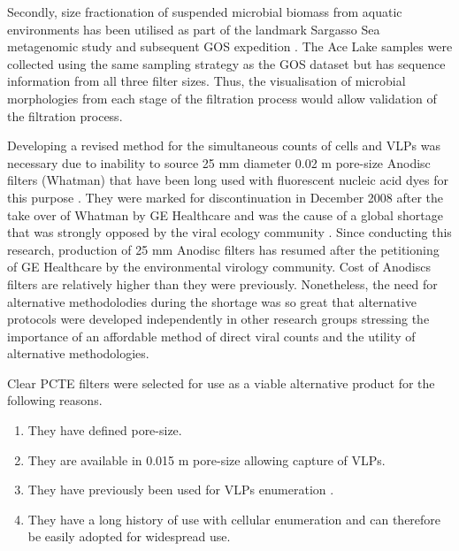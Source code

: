 Secondly, size fractionation of suspended microbial biomass from aquatic environments has been utilised as part of the landmark Sargasso Sea metagenomic study \cite{Venter2004} and subsequent \ac{GOS} expedition \cite{Rusch2007}.
The Ace Lake samples were collected using the same sampling strategy as the \ac{GOS} dataset but has sequence information from all three filter sizes. 
Thus, the visualisation of microbial morphologies from each stage of the filtration process would allow validation of the filtration process.

Developing a revised method for the simultaneous counts of cells and \acp{VLP} was necessary due to inability to source 25 mm diameter 0.02 \textmu{}m pore-size Anodisc filters (Whatman) that have been long used with fluorescent nucleic acid dyes for this purpose \cite{Hennes1995, Noble1998}. 
They were marked for discontinuation in December 2008 after the take over of Whatman by \textsc{GE} Healthcare and was the cause of a global shortage that was strongly opposed by the viral ecology community \cite{Torrice2009}.
Since conducting this research, production of 25 mm Anodisc filters has resumed after the petitioning of \textsc{GE} Healthcare by the environmental virology community. 
Cost of Anodiscs filters are relatively higher than they were previously. %
Nonetheless, the need for alternative methodolodies during the shortage was so great that alternative protocols were developed independently in other research groups \cite{Budinoff2011, Diemer2012} stressing the importance of an affordable method of direct viral counts and the utility of alternative methodologies. %

Clear \ac{PCTE} filters were selected for use as a viable alternative product for the following reasons. 
\begin{enumerate}
\item They have defined pore-size. %
\item They are available in 0.015 \textmu{}m pore-size allowing capture of \acp{VLP}.
\item They have previously been used for \acp{VLP} enumeration \cite{Hara1991, Proctor1992}.
\item They have a long history of use with cellular enumeration \cite{Hobbie1977} and can therefore be easily adopted for widespread use.
\end{enumerate}


